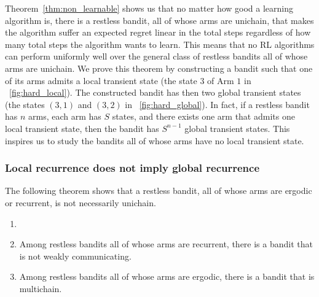 Theorem~\ref{thm:non_learnable} shows us that no matter how good a learning algorithm is, there is a restless bandit, all of whose arms are unichain, that makes the algorithm suffer an expected regret linear in the total steps regardless of how many total steps the algorithm wants to learn.
This means that no RL algorithms can perform uniformly well over the general class of restless bandits all of whose arms are unichain.
We prove this theorem by constructing a bandit such that one of its arms admits a local transient state (the state $3$ of Arm $1$ in \figurename~\ref{fig:hard_local}).
The constructed bandit has then two global transient states (the states $(3,1)$ and $(3,2)$ in \figurename~\ref{fig:hard_global}).
In fact, if a restless bandit has $n$ arms, each arm has $S$ states, and there exists one arm that admits one local transient state, then the bandit has $S^{n-1}$ global transient states.
This inspires us to study the bandits all of whose arms have no local transient state.

\subsubsection{Local recurrence does not imply global recurrence}

The following theorem shows that a restless bandit, all of whose arms are ergodic or recurrent, is not necessarily unichain.

\begin{thm}
    \label{thm:multichain}
    \begin{enumerate}[label=(\roman*)]
        \item[]
        \item \label{thm:not_ergodic} Among restless bandits all of whose arms are recurrent, there is a bandit that is not weakly communicating. %
        \item \label{thm:ergodic_arms_multichain_RB} Among restless bandits all of whose arms are ergodic, there is a bandit that is multichain.
    \end{enumerate}
\end{thm}

